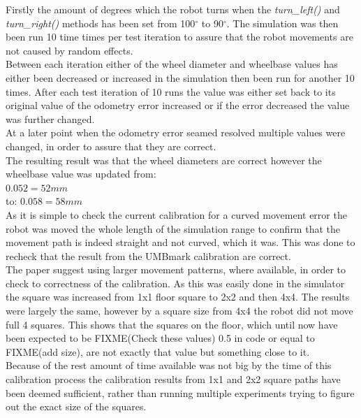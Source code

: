 Firstly the amount of degrees which the robot turns when the \textit{turn\_left()} and \textit{turn\_right()} methods has been set from 100$^{\circ}$ to 90$^{\circ}$. The simulation was then been run 10 time times per test iteration to assure that the robot movements are not caused by random effects.\\
Between each iteration either of the wheel diameter and wheelbase values has either been decreased or increased in the simulation then been run for another 10 times. After each test iteration of 10 runs the value was either set back to its original value of the odometry error increased or if the error decreased the value was further changed. \\
At a later point when the odometry error seamed resolved multiple values were changed, in order to assure that they are correct. \\
The resulting result was that the wheel diameters are correct however the wheelbase value was updated from:\\
$0.052 = 52mm$\\ 
to:
$0.058 = 58mm$\\ 
As it is simple to check the current calibration for a curved movement error the robot was moved the whole length of the simulation range to confirm that the movement path is indeed straight and not curved, which it was. This was done to recheck that the result from the UMBmark calibration are correct. \\[3ex]

The paper suggest using larger movement patterns, where available, in order to check to correctness of the calibration. As this was easily done in the simulator the square was increased from 1x1 floor square to 2x2 and then 4x4. The results were largely the same, however by a square size from 4x4 the robot did not move full 4 squares. This shows that the squares on the floor, which until now have been expected to be FIXME(Check these values) 0.5 in code or equal to FIXME(add size), are not exactly that value but something close to it. \\
Because of the rest amount of time available was not big by the time of this calibration process the calibration results from 1x1 and 2x2 square paths have been deemed sufficient, rather than running multiple experiments trying to figure out the exact size of the squares. 










 





